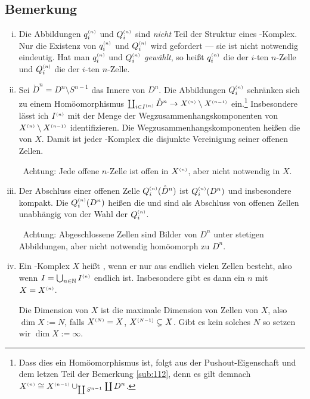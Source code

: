 \subsection[Bemerkungen zur Definition von \CW-Komplexen]{Bemerkung} %
\label{sub:114}
\begin{enumerate}[(i)]
	\item Die Abbildungen $q_i^{\scriptscriptstyle(n)}$ und $Q_i^{\scriptscriptstyle(n)}$ sind \emph{nicht} Teil der Struktur eines \CW-Komplex. Nur die Existenz von $q_i^{\scriptscriptstyle(n)}$ und $Q_i^{\scriptscriptstyle(n)}$ wird 
	gefordert --- sie ist nicht notwendig eindeutig. Hat man $q_i^{\scriptscriptstyle(n)}$ und $Q_i^{\scriptscriptstyle(n)}$ \emph{gewählt}, so heißt $q_i^{\scriptscriptstyle(n)}$ die  der $i$-ten
	$n$-Zelle und $Q_i^{\scriptscriptstyle(n)}$ die  der $i$-ten $n$-Zelle.
	\item Sei $\mathring{D}^n = D^n \setminus S^{n-1}$ das Innere von $D^n$. Die Abbildungen $Q_i^{\scriptscriptstyle(n)}$ schränken sich zu einem Homöomorphismus 
	$\coprod_{i \in I^{(n)}} \mathring{D}^n \to X^{\scriptscriptstyle(n)} \setminus X^{\scriptscriptstyle(n-1)}$ ein.\footnote{Dass dies ein Homöomorphismus ist, folgt 
	aus der Pushout-Eigenschaft und dem letzen Teil der Bemerkung \ref{sub:112}, denn es gilt demnach 
	$X^{\scriptscriptstyle(n)}\cong X^{\scriptscriptstyle(n-1)}\cup_{\coprod S^{n-1}} \coprod D^n$.} 
	Insbesondere lässt ich $I^{\scriptscriptstyle(n)}$ mit der Menge der Wegzusammenhangskomponenten von 
	$X^{\scriptscriptstyle(n)} \setminus X^{\scriptscriptstyle(n-1)}$ identifizieren. Die Wegzusammenhangskomponenten heißen die  von $X$. Damit ist jeder \CW-Komplex 
	die disjunkte Vereinigung seiner offenen Zellen.
	
	\ifxetexorluatex \faWarning \, \fi Achtung: Jede offene $n$-Zelle ist offen in $X^{\scriptscriptstyle(n)}$, aber nicht notwendig in $X$.
	\item Der Abschluss einer offenen Zelle $Q_i^{\scriptscriptstyle(n)}(\mathring{D}^n)$ ist $Q_i^{\scriptscriptstyle(n)}(D^n)$ und insbesondere kompakt. Die $Q_i^{\scriptscriptstyle(n)}(D^n)$ heißen die
	 und sind als Abschluss von offenen Zellen unabhängig von der Wahl der $Q_i^{\scriptscriptstyle(n)}$.
	
	\ifxetexorluatex \faWarning \, \fi Achtung: Abgeschlossene Zellen sind Bilder von $D^n$ unter stetigen Abbildungen, aber nicht notwendig homöomorph zu $D^n$.
	\item Ein \CW-Komplex $X$ heißt , wenn er nur aus endlich vielen Zellen besteht, also wenn 
	$I = \bigcup_{n \in \mathbb{N} } I^{\scriptscriptstyle(n)}$ endlich ist. Insbesondere gibt es dann ein $n$ mit $X=X^{\scriptscriptstyle(n)}$.
	
	Die Dimension von $X$ ist die maximale Dimension von Zellen von $X$, also $\dim X := N$, falls $X^{\scriptscriptstyle(N)}=X$, $X^{\scriptscriptstyle(N-1)} \subsetneq X$. Gibt es kein solches 
	$N$ so setzen wir $\dim X := \infty$.
\end{enumerate}

